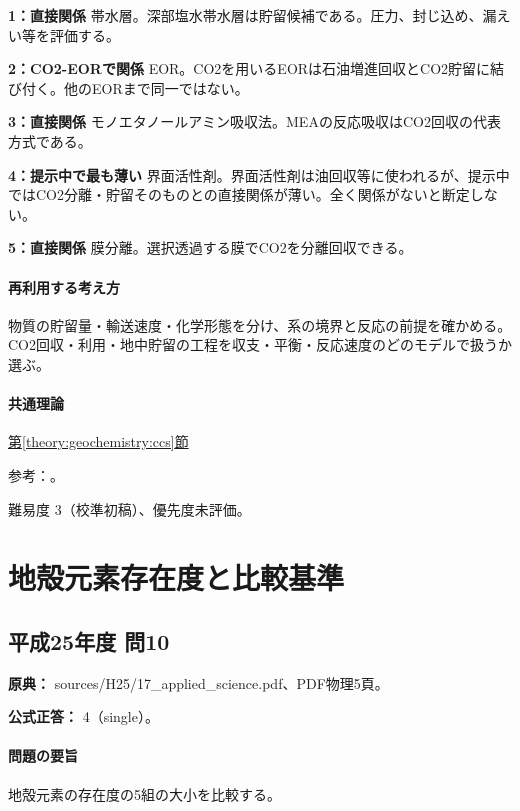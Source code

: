 \noindent\textbf{1：直接関係} 帯水層。深部塩水帯水層は貯留候補である。圧力、封じ込め、漏えい等を評価する。\par

\noindent\textbf{2：CO2-EORで関係} EOR。CO2を用いるEORは石油増進回収とCO2貯留に結び付く。他のEORまで同一ではない。\par

\noindent\textbf{3：直接関係} モノエタノールアミン吸収法。MEAの反応吸収はCO2回収の代表方式である。\par

\noindent\textbf{4：提示中で最も薄い} 界面活性剤。界面活性剤は油回収等に使われるが、提示中ではCO2分離・貯留そのものとの直接関係が薄い。全く関係がないと断定しない。\par

\noindent\textbf{5：直接関係} 膜分離。選択透過する膜でCO2を分離回収できる。\par

\paragraph{再利用する考え方} 物質の貯留量・輸送速度・化学形態を分け、系の境界と反応の前提を確かめる。CO2回収・利用・地中貯留の工程を収支・平衡・反応速度のどのモデルで扱うか選ぶ。

\paragraph{共通理論} \hyperref[theory:geochemistry:ccs]{第\ref*{theory:geochemistry:ccs}節}

\par 参考：\cite{gc_ccs,gc_capture,gc_mea}。

\par 難易度 3（校準初稿）、優先度未評価。

\section{地殻元素存在度と比較基準}

\subsection{平成25年度 問10}
\label{q:h25-reg-applied-10}

\noindent\textbf{原典：} sources/H25/17\_applied\_science.pdf、PDF物理5頁。

\textbf{公式正答：} 4（single）。

\paragraph{問題の要旨} 地殻元素の存在度の5組の大小を比較する。

